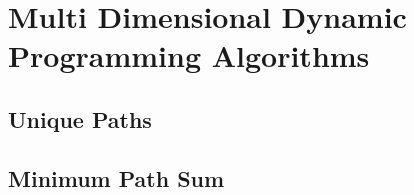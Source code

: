 \chapter{Multi Dimensional Dynamic Programming Algorithms}

\section{Unique Paths}


\section{Minimum Path Sum}
